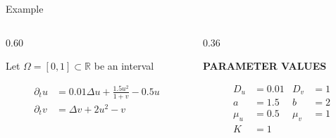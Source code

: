 \begin{frame}{Example}
  \hypertarget{example}{}
  \vspace{-0.44cm}

  
  
  \begin{columns}[c,onlytextwidth]
    
    \begin{column}{0.60\textwidth}
      
      {\color{HydraWhite}\fontsize{9.6}{12.1}\selectfont
      Let $\Omega=[0,1] \subset \mathbb{R}$ be an interval
      }

      \vspace{-0.4cm}
      {\color{HydraWhite}\fontsize{10.2}{13}\selectfont
      \begin{align*}
        \partial_tu
        &=
        0.01\Delta u
        +
        \frac{1.5u^2}{1+v}
        -
        0.5u
        \\
        \partial_tv
        &=
        \Delta v
        +
        2u^2
        -
        v
      \end{align*}
      }



    \end{column}

    \begin{column}{0.36\textwidth}

      \vspace{0.5cm}
      \centering

      {\color{HydraMuted}\bfseries\fontsize{7.6}{9.1}\selectfont
        PARAMETER VALUES\par}

      \vspace{-0.30cm}

      {\color{HydraWhite}\fontsize{8.8}{11.2}\selectfont
      \begin{align*}
        D_u&=0.01
        &
        D_v&=1
        \\
        a&=1.5
        &
        b&=2
        \\
        \mu_u&=0.5
        &
        \mu_v&=1
        \\
        K&=1
      \end{align*}
      }


\end{column}
\end{columns}
\end{frame}
